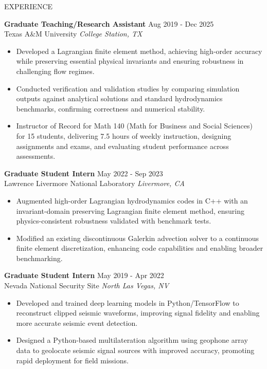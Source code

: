 \documentclass{resume} %
\begin{document}
\begin{rSection}{EXPERIENCE}

\textbf{Graduate Teaching/Research Assistant} \hfill Aug 2019 - Dec 2025\\
Texas A\&M University \hfill \textit{College Station, TX}%
 \begin{itemize}
    \item Developed a Lagrangian finite element method, achieving high-order accuracy while preserving essential physical invariants and ensuring robustness in challenging flow regimes.
    \item Conducted verification and validation studies by comparing simulation outputs against analytical solutions and standard hydrodynamics benchmarks, confirming correctness and numerical stability.
    \item Instructor of Record for Math 140 (Math for Business and Social Sciences) for 15 students, delivering 7.5 hours of weekly instruction, designing assignments and exams, and evaluating student performance across assessments.
 \end{itemize}
\vspace{1em}
\textbf{Graduate Student Intern} \hfill May 2022 - Sep 2023\\
Lawrence Livermore National Laboratory \hfill \textit{Livermore,  CA} %
\begin{itemize}
    \item Augmented high-order Lagrangian hydrodynamics codes in C++ with an invariant-domain preserving Lagrangian finite element method, ensuring physics-consistent robustness validated with benchmark tests.
    \item Modified an existing discontinuous Galerkin advection solver to a continuous finite element discretization, enhancing code capabilities and enabling broader benchmarking.
\end{itemize}
 \vspace{1em}
\textbf{Graduate Student Intern} \hfill May 2019 - Apr 2022\\
Nevada National Security Site \hfill \textit{North Las Vegas, NV} %
 \begin{itemize}
     \item Developed and trained deep learning models in Python/TensorFlow to reconstruct clipped seismic waveforms, improving signal fidelity and enabling more accurate seismic event detection.
    \item Designed a Python-based multilateration algorithm using geophone array data to geolocate seismic signal sources with improved accuracy, promoting rapid deployment for field missions.
 \end{itemize}

\end{rSection} 
\end{document}
